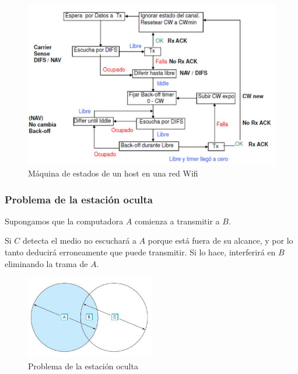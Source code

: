 \begin{figure}[H]
	\centering
	\includegraphics[width=\textwidth
]{images/wifi-estados.jpg}
	\caption[Máquina de estados de un host en una red Wifi]{Máquina de estados de un host en una red Wifi}
	\label{fig:wifi-estados}
\end{figure}

\subsubsection*{Problema de la estación oculta}
Supongamos que la computadora \(A\) comienza a transmitir a \(B\). 

Si \(C\) detecta el medio no escuchará a \(A\) porque está fuera de su alcance, y por lo tanto deducirá erroneamente que puede transmitir. Si lo hace, interferirá en \(B\) eliminando la trama de \(A\).

\begin{figure}[H]
	\centering
	\includegraphics[width=0.5\textwidth
]{images/estacion-oculta.jpg}
	\caption[Problema de la estación oculta]{Problema de la estación oculta}
	\label{fig:estacion-oculta}
\end{figure}

